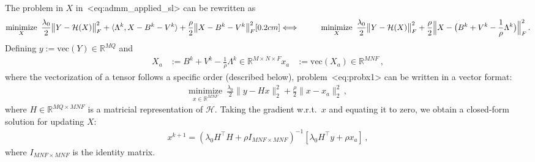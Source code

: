 \documentclass[a4paper,11pt]{article}
\def\\{}%
\def\eqref#1{<#1>}%
\newcommand{\mypar}[1]{\bigskip\noindent {\bf #1.}}
\begin{document}
\mypar{Updating $\bm{X}$}
The problem in $X$ in~\eqref{eq:admm_applied_sl} can be rewritten as
\begin{align}
  &
  \underset{X}{\text{minimize}}\,\,\,
  \frac{\lambda_0}{2}
  \big\|Y - \mathcal{H}(X)\big\|_F^2
  +
  \langle\Lambda^k, X - B^{k} - V^{k}\rangle
  +
  \frac{\rho}{2}
  \big\|X - B^k - V^k\big\|_{F}^2
  \notag
  \\[0.2cm]
  \Longleftrightarrow\qquad &
  \underset{X}{\text{minimize}}\,\,\,
  \frac{\lambda_0}{2}
  \big\|Y - \mathcal{H}(X) \big\|_F^2
  +
  \frac{\rho}{2}
  \Big\| X - \big(B^k + V^k - \frac{1}{\rho}\Lambda^k\big) \Big\|_F^2\,.
  \label{eq:probx1}
\end{align}
Defining $y := \text{vec}(Y) \in \mathbb{R}^{MQ}$ and
\begin{align*}
  X_a &:= B^k + V^k - \frac{1}{\rho}\Lambda^k \in \mathbb{R}^{M \times N \times F}
  \\
  x_a &:= \text{vec}(X_a) \in \mathbb{R}^{MNF}\,,
\end{align*}
where the vectorization of a tensor follows a specific order (described below),
problem~\eqref{eq:probx1} can be written in a vector format:
\begin{align*}
  \underset{x \in \mathbb{R}^{MNF}}{\text{minimize}}\,\,\,
  \frac{\lambda_0}{2}
  \|y - Hx\|_2^2
  +
  \frac{\rho}{2}
  \| x - x_a\|_2^2\,,
\end{align*}
where $H \in \mathbb{R}^{MQ \times MNF}$ is a matricial representation of
$\mathcal{H}$. Taking the gradient w.r.t.\ $x$ and equating it to zero, we
obtain a closed-form solution for updating $X$:
\begin{align}
  x^{k+1}
  =
  \left(\lambda_0 H^\top H + \rho I_{MNF \times MNF}\right)^{-1}
  \left[\lambda_0 H^\top y + \rho x_a\right]\,,
  \label{eq:probxclosedformvec}
\end{align}
where $I_{MNF \times MNF}$ is the identity matrix. 
\end{document}
